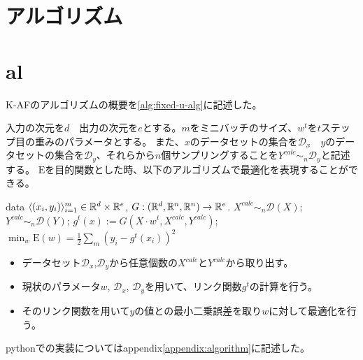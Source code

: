 \section{アルゴリズム}
\section{al}
K-AFのアルゴリズムの概要を\ref{alg:fixed-u-alg}に記述した。

入力の次元を$ d $　出力の次元を$ e $とする。$ m $をミニバッチのサイズ、$ w^t $を$t$ステップ目の重みのパラメータとする。
また、$x$のデータセットの集合を$ \mathcal{D}_x $　$y$のデータセットの集合を$ \mathcal{D}_y $、それらから$n$個サンプリングすることを$ Y^{calc} \sim_n \mathcal{D}_y $と記述する。
$ \mathrm{E} $を目的関数とした時、以下のアルゴリズムで最適化を表現することができる。



\begin{algorithm}[]
	\caption{\KAF}
	\label{alg:fixed-u-alg}
\begin{algorithmic}
	 data $\langle (x_i, y_i) \rangle_{i=1}^m \in
	\mathbb{R}^d \times \mathbb{R}^e$, $G: ( \mathbb{R}^d, \mathbb{R}^n, \mathbb{R}^n ) \rightarrow  \mathbb{R}^e$.
	\STATE $X^{calc} \sim_n \mathcal{D}(X)$;
    \STATE $Y^{calc} \sim_n \mathcal{D}(Y)$;
	\STATE $g^t(x) := G(X \cdot w^t, X^{calc}, Y^{calc} )$;
	\STATE $ \displaystyle{\min_{w} \mathrm{E}(w)} = \frac{1}{2}\sum_m (y_i - g^t(x_i))^2 $
	\ENDFOR
\end{algorithmic}
\end{algorithm}

\begin{itemize}
  \item データセット$\mathcal{D}_x$,$\mathcal{D}_y$から任意個数の$ X^{calc} $と$ Y^{calc} $から取り出す。
  \item 現状のパラメータ$ w $, $\mathcal{D}_x$, $\mathcal{D}_y$を用いて、リンク関数$ g^t $の計算を行う。
  \item そのリンク関数を用いて$ y $の値との最小二乗誤差を取り$ w $に対して最適化を行う。
\end{itemize}


pythonでの実装についてはappendix\ref{appendix:algorithm}に記述した。






